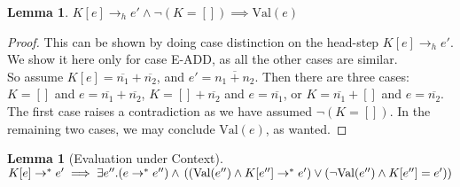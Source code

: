\documentclass[twoside,11pt,openright]{report}
\newtheorem{lemma}[theorem]{Lemma}
\theoremstyle{definition}
\newcommand{\expr}{e}
\newcommand{\Num}[1]{\overline{#1}}
\newcommand{\empelctx}{[]}
\newcommand{\elctx}{K}
\newcommand{\stepS}{\rightarrow^*}
\newcommand{\hstep}{\rightarrow_h}
\newcommand{\Val}[1]{\mathrm{Val}(#1)}
\begin{document}



\begin{lemma}\label{lem:headstep_val}
  $\elctx[\expr] \hstep \expr' \land \neg (\elctx = \empelctx) \implies \Val{e}$
\end{lemma}

\begin{proof}
  This can be shown by doing case distinction on the head-step $\elctx[\expr] \hstep \expr'$. We show it here only for case E-ADD, as all the other cases are similar. \medskip\\
  So assume $\elctx[\expr] = \Num{n_1} + \Num{n_2}$, and $\expr' = \Num{n_1 + n_2}$.
  Then there are three cases: $\elctx = []$ and $\expr = \Num{n_1} + \Num{n_2}$, $\elctx = [] + \Num{n_2}$ and $\expr = \Num{n_1}$, or $\elctx = \Num{n_1} + []$ and $\expr = \Num{n_2}$. The first case raises a contradiction as we have assumed $\neg (\elctx = \empelctx)$. In the remaining two cases, we may conclude $\Val{\expr}$, as wanted.
\end{proof}


\begin{lemma}[Evaluation under Context]\label{lem:EuC}
  $ \elctx[\expr] \stepS \expr' \implies 
    \exists \expr'' . (\expr \stepS \expr'') \land\\
    \left( (\Val{\expr''} \land \elctx[\expr''] \stepS \expr') \lor
    (\neg \Val{\expr''} \land \elctx[\expr''] = \expr') \right)
    $
\end{lemma}
\end{document}
